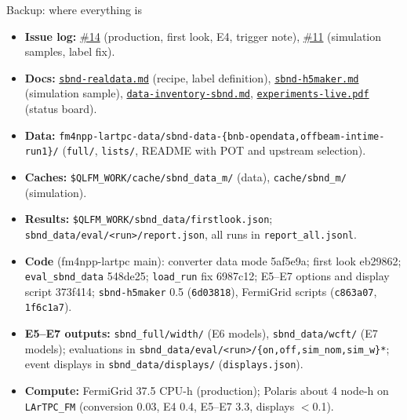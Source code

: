 \documentclass[aspectratio=169,10pt]{beamer}
\newcommand{\code}[1]{\texttt{#1}}
\newcommand{\gh}{https://github.com/HaiwangYu/fm4npp-lartpc}
\newcommand{\iss}[1]{\href{\gh/issues/#1}{\color{blue!60!black}\##1}}
\newcommand{\doc}[1]{\href{\gh/blob/main/multi-modal-qlmatch/docs/#1}{\color{blue!60!black}\texttt{#1}}}
\begin{document}


\begin{frame}{Backup: where everything is}
  \scriptsize
  \begin{itemize}\setlength{\itemsep}{3pt}
    \item \textbf{Issue log:} \iss{14} (production, first look, E4, trigger note), \iss{11} (simulation samples, label fix).
    \item \textbf{Docs:} \doc{sbnd-realdata.md} (recipe, label definition), \doc{sbnd-h5maker.md} (simulation sample),
      \doc{data-inventory-sbnd.md}, \doc{experiments-live.pdf} (status board).
    \item \textbf{Data:} \code{fm4npp-lartpc-data/sbnd-data-\{bnb-opendata,offbeam-intime-run1\}/} (\code{full/}, \code{lists/}, README with POT and upstream selection).
    \item \textbf{Caches:} \code{\$QLFM\_WORK/cache/sbnd\_data\_m/} (data), \code{cache/sbnd\_m/} (simulation).
    \item \textbf{Results:} \code{\$QLFM\_WORK/sbnd\_data/firstlook.json}; \code{sbnd\_data/eval/<run>/report.json}, all runs in \code{report\_all.jsonl}.
    \item \textbf{Code} (fm4npp-lartpc main): converter data mode 5af5e9a; first look eb29862; \code{eval\_sbnd\_data} 548de25;
      \code{load\_run} fix 6987c12; E5--E7 options and display script 373f414; \code{sbnd-h5maker} 0.5 (\code{6d03818}), FermiGrid scripts (\code{c863a07}, \code{1f6c1a7}).
    \item \textbf{E5--E7 outputs:} \code{sbnd\_full/width/} (E6 models), \code{sbnd\_data/wcft/} (E7 models); evaluations in
      \code{sbnd\_data/eval/<run>/\{on,off,sim\_nom,sim\_w\}*}; event displays in \code{sbnd\_data/displays/} (\code{displays.json}).
    \item \textbf{Compute:} FermiGrid 37.5 CPU-h (production); Polaris about 4 node-h on \code{LArTPC\_FM} (conversion 0.03, E4 0.4,
      E5--E7 3.3, displays $<$0.1).
  \end{itemize}
\end{frame}
\end{document}
